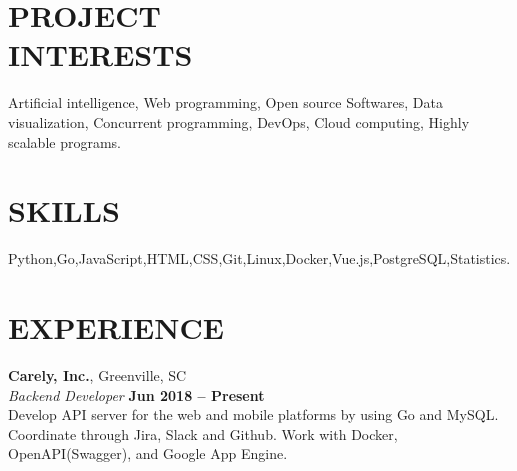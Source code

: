 \documentclass[margin,line]{resume}
\begin{document}
\begin{resume}

\vspace{1mm}

    \section{\mysidestyle \textbf{\large{P}\small{ROJECT\\INTERESTS}}}

    	Artificial intelligence, Web programming, Open source Softwares, Data visualization, Concurrent programming, DevOps, Cloud computing, Highly scalable programs.

\sectionline

    \section{\mysidestyle \textbf{\large{S}\small{KILLS}}}

    Python,\hspace{2mm}Go,\hspace{2mm}JavaScript,\hspace{2mm}HTML,\hspace{2mm}CSS,\hspace{2mm}Git,\hspace{2mm}Linux,\hspace{2mm}Docker,\hspace{2mm}Vue.js,\hspace{2mm}PostgreSQL,\hspace{2mm}Statistics.
    


\sectionline

    \section{\mysidestyle \textbf{\large{E}\small{XPERIENCE}}}

    \textbf{\listing Carely, Inc.}, Greenville, SC \vspace{2mm}\\\vspace{1mm}%
    \textsl{Backend Developer} \hfill \textbf{Jun 2018 -- Present}\\
    Develop API server for the web and mobile platforms by using Go and MySQL. Coordinate through Jira, Slack and Github. Work with Docker, OpenAPI(Swagger), and Google App Engine.\vspace{1mm}
    

\end{resume}
\end{document}
